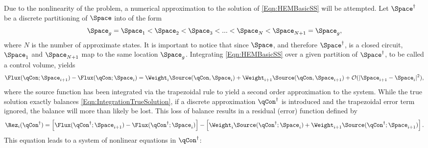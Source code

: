 Due to the nonlinearity of the problem, a numerical approximation to the solution of \cref{Eqn:HEMBasicSS} will be attempted.
Let $\Space^\dagger$ be a discrete partitioning of $\Space$ into of the form
\[
    \Space_g = \Space_1 < \Space_2 < \Space_3 < ... < \Space_N < \Space_{N+1} = \Space_g,
\]
where $N$ is the number of approximate states.
It is important to notice that since $\Space$, and therefore $\Space^\dagger$, is a closed circuit, $\Space_1$ and $\Space_{N+1}$ map to the same location $\Space_g$.
Integrating \cref{Eqn:HEMBasicSS} over a given partition of $\Space^\dagger$, to be called a control volume, yields
\begin{equation}
    \Flux(\qCon;\Space_{i+1}) - \Flux(\qCon;\Space_i) = \Weight_i \Source(\qCon,\Space_{i}) + \Weight_{i+1} \Source(\qCon,\Space_{i+1}) + \mathcal{O}(|\Space_{i+1}-\Space_i|^2),
    \label{Eqn:IntegrationTrueSolution}
\end{equation}
where the source function has been integrated via the trapezoidal rule to yield a second order approximation to the system.
While the true solution \qCon exactly balances \cref{Eqn:IntegrationTrueSolution}, if a discrete approximation $\qCon^\dagger$ is introduced and the trapezoidal error term ignored, the balance will more than likely be lost.  This loss of balance results in a residual (error) function defined by
\begin{equation}
    \Rez_i(\qCon^\dagger) = \left[\Flux(\qCon^\dagger;\Space_{i+1}) - \Flux(\qCon^\dagger;\Space_i)\right] -
                       \left[\Weight_i \Source(\qCon^\dagger;\Space_{i}) + \Weight_{i+1} \Source(\qCon^\dagger;\Space_{i+1})\right].
    \label{Eqn:IntegrationApproxSolution}
\end{equation}
This equation leads to a system of nonlinear equations in $\qCon^\dagger$:
